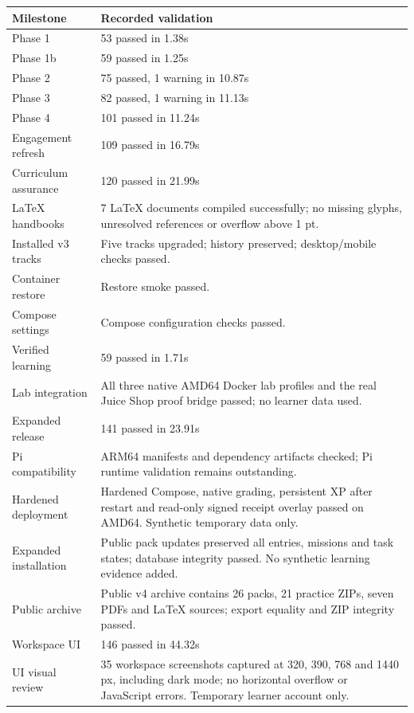 \begin{longtable}{p{}p{}}
\textbf{Milestone} & \textbf{Recorded validation} \\
\hline
Phase 1 & 53 passed in 1.38s \\
Phase 1b & 59 passed in 1.25s \\
Phase 2 & 75 passed, 1 warning in 10.87s \\
Phase 3 & 82 passed, 1 warning in 11.13s \\
Phase 4 & 101 passed in 11.24s \\
Engagement refresh & 109 passed in 16.79s \\
Curriculum assurance & 120 passed in 21.99s \\
LaTeX handbooks & 7 LaTeX documents compiled successfully; no missing glyphs, unresolved references or overflow above 1 pt. \\
Installed v3 tracks & Five tracks upgraded; history preserved; desktop/mobile checks passed. \\
Container restore & Restore smoke passed. \\
Compose settings & Compose configuration checks passed. \\
Verified learning & 59 passed in 1.71s \\
Lab integration & All three native AMD64 Docker lab profiles and the real Juice Shop proof bridge passed; no learner data used. \\
Expanded release & 141 passed in 23.91s \\
Pi compatibility & ARM64 manifests and dependency artifacts checked; Pi runtime validation remains outstanding. \\
Hardened deployment & Hardened Compose, native grading, persistent XP after restart and read-only signed receipt overlay passed on AMD64. Synthetic temporary data only. \\
Expanded installation & Public pack updates preserved all entries, missions and task states; database integrity passed. No synthetic learning evidence added. \\
Public archive & Public v4 archive contains 26 packs, 21 practice ZIPs, seven PDFs and LaTeX sources; export equality and ZIP integrity passed. \\
Workspace UI & 146 passed in 44.32s \\
UI visual review & 35 workspace screenshots captured at 320, 390, 768 and 1440 px, including dark mode; no horizontal overflow or JavaScript errors. Temporary learner account only. \\

\end{longtable}
